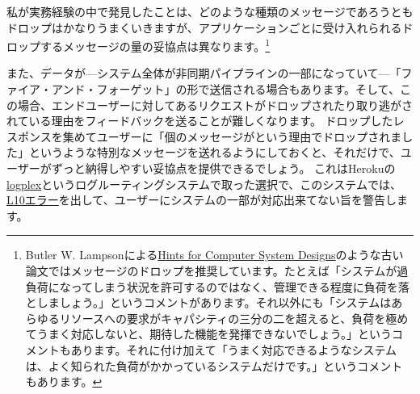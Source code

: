 私が実務経験の中で発見したことは、どのような種類のメッセージであろうともドロップはかなりうまくいきますが、アプリケーションごとに受け入れられるドロップするメッセージの量の妥協点は異なります。\footnote{Butler W. Lampsonによる\href{http://research.microsoft.com/en-us/um/people/blampson/33-hints/webpage.html}{Hints for Computer System Designs}のような古い論文ではメッセージのドロップを推奨しています。たとえば「システムが過負荷になってしまう状況を許可するのではなく、管理できる程度に負荷を落としましょう。」というコメントがあります。それ以外にも「システムはあらゆるリソースへの要求がキャパシティの三分の二を超えると、負荷を極めてうまく対応しないと、期待した機能を発揮できないでしょう。」というコメントもあります。それに付け加えて「うまく対応できるようなシステムは、よく知られた負荷がかかっているシステムだけです。」というコメントもあります。}

また、データが---システム全体が非同期パイプラインの一部になっていて---「ファイア・アンド・フォーゲット」の形で送信される場合もあります。そして、この場合、エンドユーザーに対してあるリクエストがドロップされたり取り逃がされている理由をフィードバックを送ることが難しくなります。
ドロップしたレスポンスを集めてユーザーに「個のメッセージがという理由でドロップされました」というような特別なメッセージを送れるようにしておくと、それだけで、ユーザーがずっと納得しやすい妥協点を提供できるでしょう。
これはHerokuの\href{https://devcenter.heroku.com/articles/logplex}{logplex}というログルーティングシステムで取った選択で、このシステムでは、\href{https://devcenter.heroku.com/articles/error-codes\#l10-drain-buffer-overflow}{L10エラー}を出して、ユーザーにシステムの一部が対応出来てない旨を警告します。

